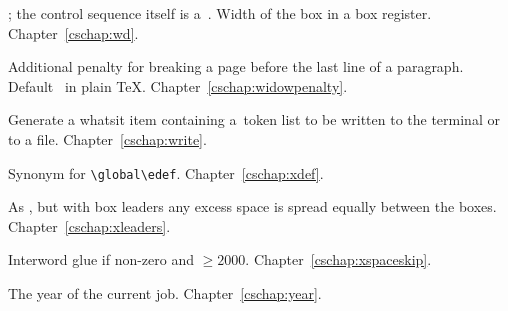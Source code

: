 \begin{glossinventory}
\item [\cs{wd\gr{8-bit number}}]
      ; the control sequence itself
      is a~.
      Width of the box in a box register.
Chapter~\ref{cschap:wd}.

\item [\cs{widowpenalty}]
      Additional penalty for breaking a page before 
      the last line of a paragraph. 
      Default~ in plain \TeX.
Chapter~\ref{cschap:widowpenalty}.

\item [\cs{write\gr{number}\gr{general text}}]
      Generate a whatsit item containing
      a~token list to be written to the terminal or to a file. 
Chapter~\ref{cschap:write}.

\item [\cs{xdef}]
      Synonym for \verb-\global\edef-.
Chapter~\ref{cschap:xdef}.

\item [\cs{xleaders}]
      As , but with box leaders any excess space is 
      spread equally between the boxes.
Chapter~\ref{cschap:xleaders}.

\item [\cs{xspaceskip}]
      Interword glue if non-zero and ${}\geq2000$.
Chapter~\ref{cschap:xspaceskip}.

\item [\cs{year}]
      The year of the current job.
Chapter~\ref{cschap:year}.

\end{glossinventory}
